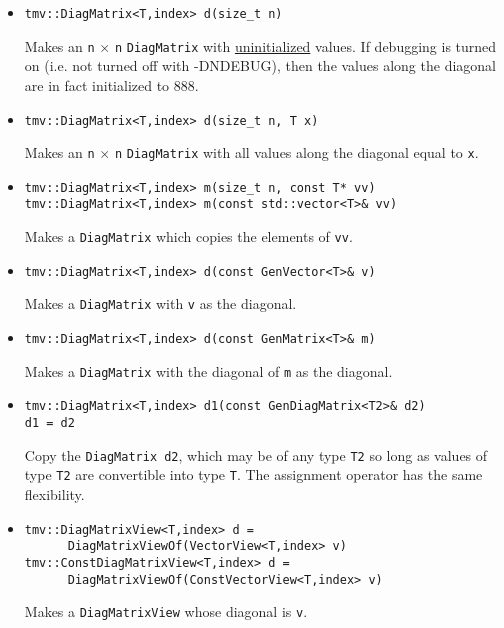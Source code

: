 \documentclass[twoside,letterpaper,11pt]{article}
\renewcommand{\tt}[1]{{\texttt {#1}}}
\begin{document}
\begin{itemize}
\item 
\begin{verbatim}
tmv::DiagMatrix<T,index> d(size_t n)
\end{verbatim}
Makes an \tt{n} $\times$ \tt{n} \tt{DiagMatrix} with \underline{uninitialized} values.
If debugging is turned on (i.e. not turned off
with -DNDEBUG), then the values along the diagonal are in fact initialized to 888. 

\item
\begin{verbatim}
tmv::DiagMatrix<T,index> d(size_t n, T x)
\end{verbatim}
Makes an \tt{n} $\times$ \tt{n} \tt{DiagMatrix} with all values along the diagonal equal to \tt{x}.

\item
\begin{verbatim}
tmv::DiagMatrix<T,index> m(size_t n, const T* vv)
tmv::DiagMatrix<T,index> m(const std::vector<T>& vv)
\end{verbatim}
Makes a \tt{DiagMatrix} which copies the elements of \tt{vv}.

\item
\begin{verbatim}
tmv::DiagMatrix<T,index> d(const GenVector<T>& v)
\end{verbatim}
Makes a \tt{DiagMatrix} with \tt{v} as the diagonal.

\item 
\begin{verbatim}
tmv::DiagMatrix<T,index> d(const GenMatrix<T>& m)
\end{verbatim}
Makes a \tt{DiagMatrix} with the diagonal of \tt{m} as the diagonal.

\item
\begin{verbatim}
tmv::DiagMatrix<T,index> d1(const GenDiagMatrix<T2>& d2)
d1 = d2
\end{verbatim}
Copy the \tt{DiagMatrix d2}, which may be of any type \tt{T2} so long
as values of type \tt{T2} are convertible into type \tt{T}.
The assignment operator has the same flexibility.

\item
\begin{verbatim}
tmv::DiagMatrixView<T,index> d = 
      DiagMatrixViewOf(VectorView<T,index> v)
tmv::ConstDiagMatrixView<T,index> d = 
      DiagMatrixViewOf(ConstVectorView<T,index> v)
\end{verbatim}
Makes a \tt{DiagMatrixView} whose diagonal is \tt{v}.


\end{itemize}
\end{document}
